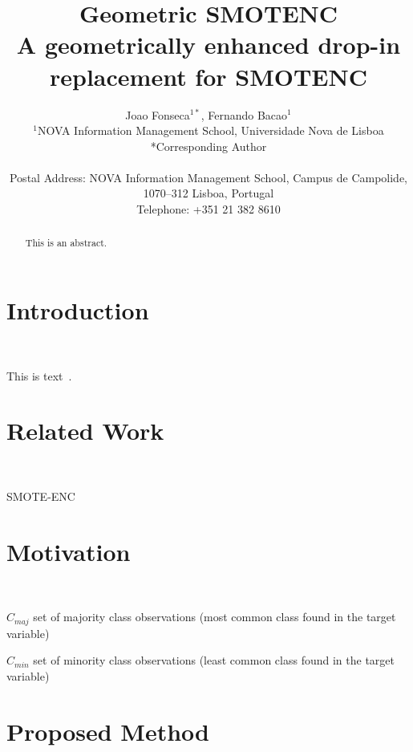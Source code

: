 \documentclass[parskip=full]{scrartcl}
\title{Geometric SMOTENC \\ \LARGE{A geometrically enhanced drop-in
replacement for SMOTENC}}
\author{%
	Joao Fonseca\(^{1*}\), Fernando Bacao\(^{1}\)
	\\
	\small{\(^{1}\)NOVA Information Management School, Universidade Nova de Lisboa}
	\\
	\small{*Corresponding Author}
	\\
	\\
	\small{Postal Address: NOVA Information Management School, Campus de
    Campolide, 1070--312 Lisboa, Portugal}
	\\
	\small{Telephone: +351 21 382 8610}
}
\date{}
\begin{document}
\maketitle

\begin{abstract}
    This is an abstract.
\end{abstract}

\section{Introduction}~\label{sec:introduction}









This is text~\cite{Chawla2002}.

\section{Related Work}~\label{sec:related_work}

SMOTE-ENC~\cite{mukherjee2021smote}

\section{Motivation}~\label{sec:motivation}

$C_{maj}$ set of majority class observations (most common class found in the
target variable)

$C_{min}$ set of minority class observations (least common class found in the
target variable)


\section{Proposed Method}~\label{sec:proposed_method}
\end{document}
